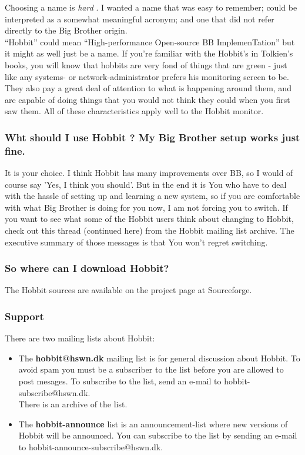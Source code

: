  Choosing a name is \emph{hard}
. I wanted a name that was easy to remember; could be interpreted as a somewhat meaningful acronym; and one that did not refer directly to the Big Brother origin.\\ 
 ``Hobbit'' could mean ``High-performance Open-source BB ImplemenTation'' but it might as well just be a name. If you're familiar with the Hobbit's in Tolkien's books, you will know that hobbits are very fond of things that are green - just like any systems- or network-administrator prefers his monitoring screen to be. They also pay a great deal of attention to what is happening around them, and are capable of doing things that you would not think they could when you first saw them. All of these characteristics apply well to the Hobbit monitor. 
\subsubsection{Wht should I use Hobbit ? My Big Brother setup works just fine.}


 It is your choice. I think Hobbit has many improvements over BB, so I would of course say 'Yes, I think you should'. But in the end it is You who have to deal with the hassle of setting up and learning a new system, so if you are comfortable with what Big Brother is doing for you now, I am not forcing you to switch. If you want to see what some of the Hobbit users think about changing to Hobbit, check out this thread (continued here) from the Hobbit mailing list archive. The executive summary of those messages is that You won't regret switching.
\subsubsection{So where can I download Hobbit?}


 The Hobbit sources are available on the project page at Sourceforge.
\subsubsection{Support}


 There are two mailing lists about Hobbit: \begin{itemize}
\item The \textbf{hobbit@hswn.dk}
 mailing list is for general discussion about Hobbit. To avoid spam you must be a subscriber to the list before you are allowed to post mesages. To subscribe to the list, send an e-mail to hobbit-subscribe@hswn.dk.\\ 
 There is an archive of the list.
\item The \textbf{hobbit-announce}
 list is an announcement-list where new versions of Hobbit will be announced. You can subscribe to the list by sending an e-mail to hobbit-announce-subscribe@hswn.dk.

\end{itemize}



